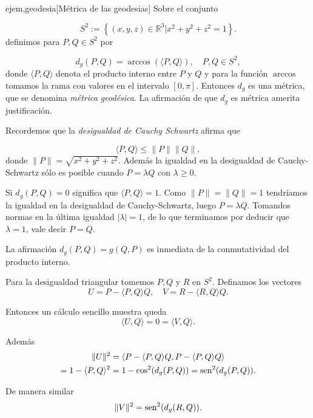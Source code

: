 \begin{ejemplo}{ejem,geodesia}[Métrica de las geodesias] Sobre el conjunto 

\[S^2:=\left\{(x,y,z)\in\mathbb{R}^3 | x^2+y^2+z^2=1\right\}.\]
definimos para $P,Q\in S^2$ por 

\[
 d_g(P,Q)=\arccos(\langle P, Q \rangle),\quad P,Q\in S^2,
\]
donde $\langle P, Q \rangle$ denota el producto interno entre $P$ y $Q$ y para la función $\arccos$ tomamos la rama con valores en el intervalo $[0,\pi]$. Entonces $d_g$ es una métrica, que se denomina \emph{métrica geodésica}. La afirmación de que $d_g$ es métrica amerita justificación.

Recordemos que la \emph{desigualdad de Cauchy Schwartz} afirma que

\begin{equation}\label{eq:C-S}
 \langle P, Q \rangle\leq \|P\| \|Q\|,
\end{equation}
donde $\|P\|=\sqrt{x^2+y^2+z^2}$. Además la igualdad en la desigualdad de Cauchy-Schwartz sólo es posible cuando $P=\lambda Q$ con $\lambda\geq 0$. 

Si $d_g(P,Q)=0$ significa que $\langle P, Q \rangle=1$.  Como $\|P\|=\|Q\|=1$ tendríamos la igualdad en la desigualdad de Cauchy-Schwartz, luego   $P=\lambda Q$. Tomandos normas en la última igualdad $|\lambda|=1$, de lo que terminamos por deducir que $\lambda=1$, vale decir $P=Q$.

La afirmación $d_g(P,Q)=g(Q,P)$ es inmediata de la conmutatividad del producto interno. 

Para la desigualdad triangular tomemos $P,Q$ y $R$ en $S^2$.  Definamos los vectores
\[
 U=P- \langle P, Q \rangle Q,\quad V=R- \langle R, Q \rangle Q.
\]

Entonces un cálculo sencillo muestra queda
\begin{equation}\label{eq:geodesica}
\langle U, Q \rangle=0= \langle V, Q \rangle . 
\end{equation}

Además
 \begin{multline}\label{eq:geodesica2}
  \|U\|^2 =\langle P- \langle P, Q \rangle Q  ,P- \langle P, Q \rangle Q   \rangle\\=1-
  \langle P, Q \rangle^2 =1-\cos^2(d_g(P,Q))=\operatorname{sen}^2(d_g(P,Q)).
 \end{multline}

 De manera similar
\begin{equation}\label{eq:geodesica3}
    \|V\|^2 =\operatorname{sen}^2(d_g(R,Q)).
\end{equation}


\end{ejemplo}
